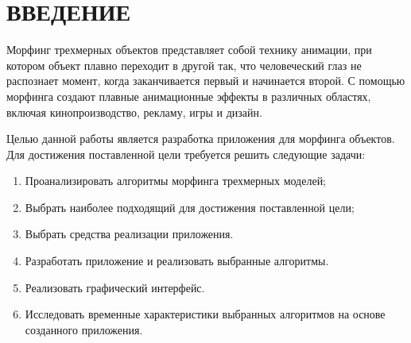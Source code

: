 \chapter*{ВВЕДЕНИЕ}

Морфинг трехмерных объектов представляет собой технику анимации, при котором объект плавно переходит в другой так, что человеческий глаз не распознает момент, когда заканчивается первый и начинается второй. С помощью морфинга создают плавные анимационные эффекты в различных областях, включая кинопроизводство, рекламу, игры и дизайн. 

Целью данной работы является разработка приложения
для морфинга объектов. Для достижения поставленной цели
требуется решить следующие задачи:

\begin{enumerate}
\item Проанализировать алгоритмы морфинга трехмерных моделей;
\item Выбрать наиболее подходящий для достижения поставленной цели;
\item Выбрать средства реализации приложения.
\item Разработать приложение и реализовать выбранные алгоритмы.
\item Реализовать графический интерфейс.
\item Исследовать временные характеристики выбранных алгоритмов на основе созданного приложения.
\end{enumerate}